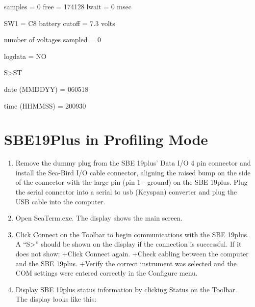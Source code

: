 \documentclass[
]{book}
\providecommand{\tightlist}{%
  \setlength{\itemsep}{0pt}\setlength{\parskip}{0pt}}
\begin{document}
samples = 0 free = 174128 lwait = 0 msec

SW1 = C8 battery cutoff = 7.3 volts

number of voltages sampled = 0

logdata = NO

S\textgreater ST

date (MMDDYY) = 060518

time (HHMMSS) = 200930

\hypertarget{sbe19plus-in-profiling-mode}{%
\section{SBE19Plus in Profiling Mode}\label{sbe19plus-in-profiling-mode}}

\begin{enumerate}
\def\labelenumi{\arabic{enumi}.}
\tightlist
\item
  Remove the dummy plug from the SBE 19plus' Data I/O 4 pin connector and install the Sea-Bird I/O cable connector, aligning the raised bump on the side of the connector with the large pin (pin 1 - ground) on the SBE 19plus. Plug the serial connector into a serial to usb (Keyspan) converter and plug the USB cable into the computer.
\item
  Open SeaTerm.exe. The display shows the main screen.
\item
  Click Connect on the Toolbar to begin communications with the SBE 19plus. A ``S\textgreater{}'' should be shown on the display if the connection is successful. If it does not show:
  +Click Connect again.
  +Check cabling between the computer and the SBE 19plus.
  +Verify the correct instrument was selected and the COM settings were entered correctly in the Configure menu.
\item
  Display SBE 19plus status information by clicking Status on the Toolbar. The display looks like this:


\end{enumerate}
\end{document}
